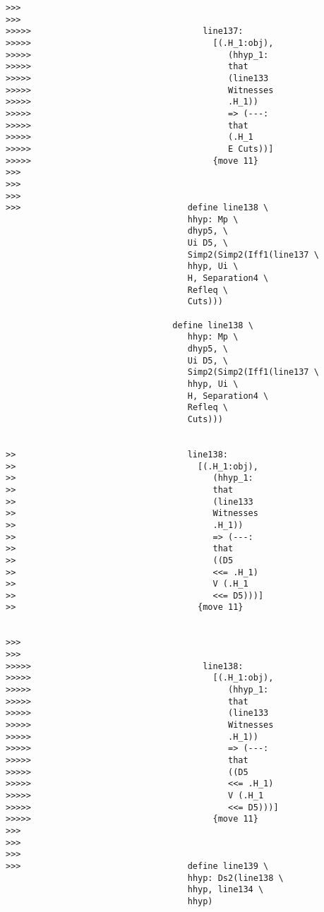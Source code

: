 \documentclass[12pt]{article}
\begin{document}
\begin{verbatim}
>>>
>>>
>>>>>                                  line137:
>>>>>                                    [(.H_1:obj),
>>>>>                                       (hhyp_1:
>>>>>                                       that
>>>>>                                       (line133
>>>>>                                       Witnesses
>>>>>                                       .H_1))
>>>>>                                       => (---:
>>>>>                                       that
>>>>>                                       (.H_1
>>>>>                                       E Cuts))]
>>>>>                                    {move 11}
>>>
>>>
>>>
>>>                                 define line138 \
                                    hhyp: Mp \
                                    dhyp5, \
                                    Ui D5, \
                                    Simp2(Simp2(Iff1(line137 \
                                    hhyp, Ui \
                                    H, Separation4 \
                                    Refleq \
                                    Cuts)))

                                 define line138 \
                                    hhyp: Mp \
                                    dhyp5, \
                                    Ui D5, \
                                    Simp2(Simp2(Iff1(line137 \
                                    hhyp, Ui \
                                    H, Separation4 \
                                    Refleq \
                                    Cuts)))


>>                                  line138:
>>                                    [(.H_1:obj),
>>                                       (hhyp_1:
>>                                       that
>>                                       (line133
>>                                       Witnesses
>>                                       .H_1))
>>                                       => (---:
>>                                       that
>>                                       ((D5
>>                                       <<= .H_1)
>>                                       V (.H_1
>>                                       <<= D5)))]
>>                                    {move 11}


>>>
>>>
>>>>>                                  line138:
>>>>>                                    [(.H_1:obj),
>>>>>                                       (hhyp_1:
>>>>>                                       that
>>>>>                                       (line133
>>>>>                                       Witnesses
>>>>>                                       .H_1))
>>>>>                                       => (---:
>>>>>                                       that
>>>>>                                       ((D5
>>>>>                                       <<= .H_1)
>>>>>                                       V (.H_1
>>>>>                                       <<= D5)))]
>>>>>                                    {move 11}
>>>
>>>
>>>
>>>                                 define line139 \
                                    hhyp: Ds2(line138 \
                                    hhyp, line134 \
                                    hhyp)


\end{verbatim}
\end{document}
